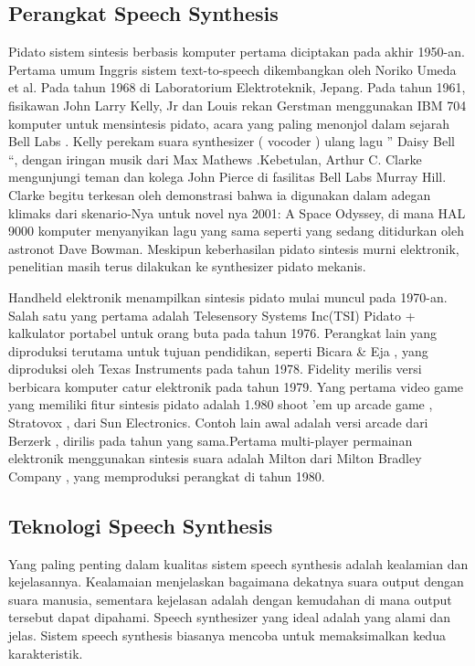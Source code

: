 \subsection{Perangkat Speech Synthesis}
Pidato sistem sintesis berbasis komputer pertama diciptakan pada akhir 1950-an. Pertama umum Inggris sistem text-to-speech dikembangkan oleh Noriko Umeda et al. Pada tahun 1968 di Laboratorium Elektroteknik, Jepang. Pada tahun 1961, fisikawan John Larry Kelly, Jr dan Louis rekan Gerstman menggunakan IBM 704 komputer untuk mensintesis pidato, acara yang paling menonjol dalam sejarah Bell Labs . Kelly perekam suara synthesizer ( vocoder ) ulang lagu ” Daisy Bell “, dengan iringan musik dari Max Mathews .Kebetulan, Arthur C. Clarke mengunjungi teman dan kolega John Pierce di fasilitas Bell Labs Murray Hill. Clarke begitu terkesan oleh demonstrasi bahwa ia digunakan dalam adegan klimaks dari skenario-Nya untuk novel nya 2001: A Space Odyssey, di mana HAL 9000 komputer menyanyikan lagu yang sama seperti yang sedang ditidurkan oleh astronot Dave Bowman. Meskipun keberhasilan pidato sintesis murni elektronik, penelitian masih terus dilakukan ke synthesizer pidato mekanis.

Handheld elektronik menampilkan sintesis pidato mulai muncul pada 1970-an. Salah satu yang pertama adalah Telesensory Systems Inc(TSI) Pidato + kalkulator portabel untuk orang buta pada tahun 1976. Perangkat lain yang diproduksi terutama untuk tujuan pendidikan, seperti Bicara \& Eja , yang diproduksi oleh Texas Instruments pada tahun 1978. Fidelity merilis versi berbicara komputer catur elektronik pada tahun 1979. Yang pertama video game yang memiliki fitur sintesis pidato adalah 1.980 shoot ’em up arcade game , Stratovox , dari Sun Electronics. Contoh lain awal adalah versi arcade dari Berzerk , dirilis pada tahun yang sama.Pertama multi-player permainan elektronik menggunakan sintesis suara adalah Milton dari Milton Bradley Company , yang memproduksi perangkat di tahun 1980.

\subsection{Teknologi Speech Synthesis}
Yang paling penting dalam kualitas sistem speech synthesis adalah kealamian dan kejelasannya. Kealamaian menjelaskan bagaimana dekatnya suara output dengan suara manusia, sementara kejelasan adalah dengan kemudahan di mana output tersebut dapat dipahami. Speech synthesizer yang ideal adalah yang alami dan jelas. Sistem speech synthesis biasanya mencoba untuk memaksimalkan kedua karakteristik.

